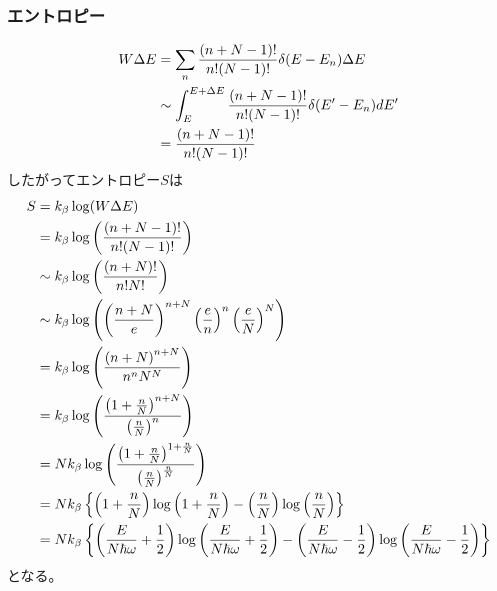 \documentclass[dvipdfmx, 11pt, a4paper]{jsarticle}
\theoremstyle{definition}
\begin{document}
\subsubsection{エントロピー}
    \begin{align}
        W \Delta E &= \sum_n \frac{(n+N-1)!}{n!(N-1)!} \delta(E-E_n) \Delta E \notag \\
        &\sim \int_E^{E+\Delta E} \frac{(n+N-1)!}{n!(N-1)!} \delta(E'-E_n) dE' \notag \\
        &= \frac{(n+N-1)!}{n!(N-1)!} \notag 
    \end{align}
    したがってエントロピー$S$は
    \begin{align}
        S &= k_\beta \log(W \Delta E) \notag \\
        &= k_\beta \log \left( \frac{(n+N-1)!}{n!(N-1)!} \right) \notag \\
        &\sim k_\beta \log \left( \frac{(n+N)!}{n!N!} \right) \notag \\
        &\sim k_\beta \log \left( \left( \frac{n+N}{e} \right)^{n+N} \left( \frac{e}{n} \right)^n \left( \frac{e}{N} \right)^N \right) \notag \\
        &= k_\beta \log \left( \frac{\left(n+N \right)^{n+N}}{n^n N^N}  \right) \notag \\
        &= k_\beta \log \left( \frac{\left(1+ \frac{n}{N} \right)^{n+N}}{\left( \frac{n}{N} \right)^n}  \right) \notag \\
        &= Nk_\beta \log \left( \frac{\left(1+ \frac{n}{N} \right)^{1 + \frac{n}{N}}}{\left( \frac{n}{N} \right)^\frac{n}{N}}  \right) \notag \\
        &= Nk_\beta \left\{ \left( 1 + \frac{n}{N} \right)\log \left( 1 + \frac{n}{N} \right) - \left( \frac{n}{N} \right)\log \left( \frac{n}{N} \right) \right\} \notag \\
        &= Nk_\beta \left\{ \left( \frac{E}{N \hbar \omega} + \frac{1}{2} \right)\log \left( \frac{E}{N \hbar \omega} + \frac{1}{2} \right) - \left( \frac{E}{N \hbar \omega} - \frac{1}{2} \right)\log \left( \frac{E}{N \hbar \omega} - \frac{1}{2} \right) \right\}
    \end{align} 
    となる。
\end{document}
